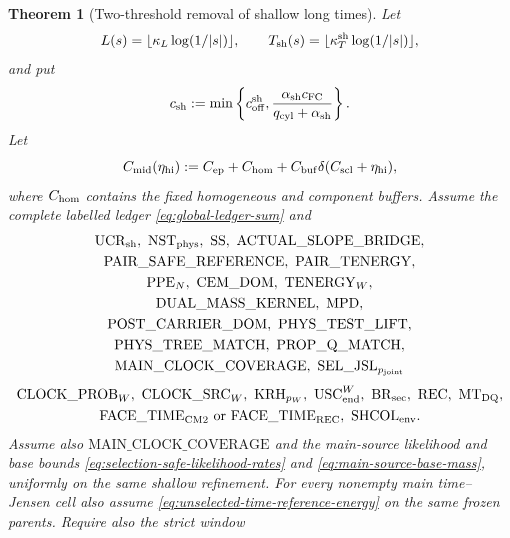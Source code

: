 \documentclass[11pt]{article}
\newtheorem{theorem}{Theorem}[section]
\begin{document}
\begin{theorem}[Two-threshold removal of shallow long times]
\label{thm:shallow-two-threshold}
Let
\[
 L(s)=\lfloor\kappa_L\log(1/|s|)\rfloor,
 \qquad T_{\rm sh}(s)=\lfloor\kappa_T^{\rm sh}\log(1/|s|)\rfloor,
\]
and put
\begin{equation}
\label{eq:shallow-collar-rate}
 c_{\rm sh}:=\min\left\{c_{\rm off}^{\rm sh},
 \frac{\alpha_{\rm sh}c_{\rm FC}}
 {q_{\rm cyl}+\alpha_{\rm sh}}\right\}.
\end{equation}
Let
\begin{equation}
\label{eq:intermediate-resolving-constant}
 C_{\rm mid}(\eta_{\rm hi})
 :=C_{\rm ep}+C_{\rm hom}
   +C_{\rm buf}\delta(C_{\rm scl}+\eta_{\rm hi}),
\end{equation}
where $C_{\rm hom}$ contains the fixed homogeneous and component buffers.
Assume the complete labelled ledger \eqref{eq:global-ledger-sum} and
\[
 \begin{gathered}
 \mathrm{UCR}_{\rm sh},\ \mathrm{NST}_{\rm phys},\ \mathrm{SS},\
 \mathrm{ACTUAL\_SLOPE\_BRIDGE},\\
 \mathrm{PAIR\_SAFE\_REFERENCE},\ \mathrm{PAIR\_TENERGY},\\
 \mathrm{PPE}_{N},\ \mathrm{CEM\_DOM},\ \mathrm{TENERGY}_{W},\\
 \mathrm{DUAL\_MASS\_KERNEL},\ \mathrm{MPD},\\
 \mathrm{POST\_CARRIER\_DOM},\ \mathrm{PHYS\_TEST\_LIFT},\\
 \mathrm{PHYS\_TREE\_MATCH},\ \mathrm{PROP\_Q\_MATCH},\\
 \mathrm{MAIN\_CLOCK\_COVERAGE},\
 \mathrm{SEL\_JSL}_{p_{\rm joint}}
 \end{gathered}
\]
\[
\begin{gathered}
 \mathrm{CLOCK\_PROB}_{W},\ \mathrm{CLOCK\_SRC}_{W},\
 \mathrm{KRH}_{p_W},\ \mathrm{USC}_{\rm end}^{W},\
 \mathrm{BR}_{\rm sec},\ \mathrm{REC},\ \mathrm{MT}_{\rm DQ},\\
 \mathrm{FACE\_TIME}_{\rm CM2}\text{ or }\mathrm{FACE\_TIME}_{\rm REC},\
 \mathrm{SHCOL}_{\rm env}.
\end{gathered}
\]
Assume also $\mathrm{MAIN\_CLOCK\_COVERAGE}$ and the main-source likelihood
and base bounds \eqref{eq:selection-safe-likelihood-rates} and
\eqref{eq:main-source-base-mass}, uniformly on the same shallow refinement.
For every nonempty main time--Jensen cell also assume
\eqref{eq:unselected-time-reference-energy} on the same frozen parents.
Require also the strict window
\begin{equation}

\end{equation}
\end{theorem}
\end{document}
